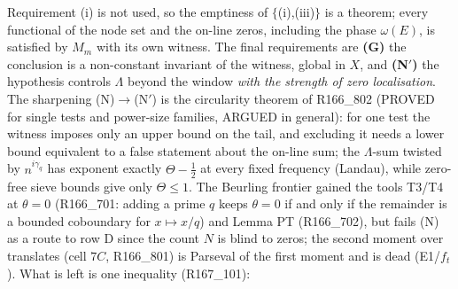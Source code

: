 \documentclass[11pt]{amsart}
\theoremstyle{definition}
\theoremstyle{remark}
\begin{document}
\noindent Requirement (i) is not used, so the emptiness of $\{$(i),(iii)$\}$ is a theorem; every functional of the node set and the
on-line zeros, including the phase $\omega(E)$, is satisfied by $M_m$ with its own witness. The final requirements are \textbf{(G)} the
conclusion is a non-constant invariant of the witness, global in $X$, and \textbf{(N$'$)} the hypothesis controls $\Lambda$ beyond the
window \emph{with the strength of zero localisation}. The sharpening (N)$\to$(N$'$) is the circularity theorem of R166\_802 (PROVED for
single tests and power-size families, ARGUED in general): for one test the witness imposes only an upper bound on the tail, and excluding it
needs a lower bound equivalent to a false statement about the on-line sum; the $\Lambda$-sum twisted by $n^{i\gamma_q}$ has exponent exactly
$\Theta-\frac12$ at every fixed frequency (Landau), while zero-free sieve bounds give only $\Theta\le1$. The Beurling frontier gained the tools
T3/T4 at $\theta=0$ (R166\_701: adding a prime $q$ keeps $\theta=0$ if and only if the remainder is a bounded coboundary for $x\mapsto x/q$) and
Lemma PT (R166\_702), but fails (N) as a route to row D since the count $N$ is blind to zeros; the second moment over translates (cell $7C$,
R166\_801) is Parseval of the first moment and is dead (E1/$f_t$). What is left is one inequality (R167\_101):

\begin{center}
\end{center}
\end{document}
